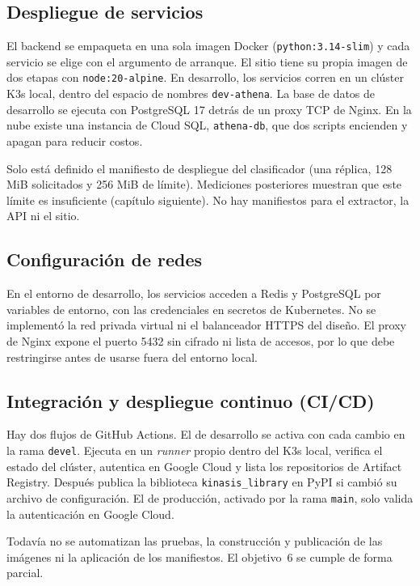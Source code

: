\subsection{Despliegue de servicios}
El backend se empaqueta en una sola imagen Docker (\texttt{python:3.14-slim}) y cada servicio se elige con el argumento de arranque. El sitio tiene su propia imagen de dos etapas con \texttt{node:20-alpine}. En desarrollo, los servicios corren en un clúster K3s local, dentro del espacio de nombres \texttt{dev-athena}. La base de datos de desarrollo se ejecuta con PostgreSQL 17 detrás de un proxy TCP de Nginx. En la nube existe una instancia de Cloud SQL, \texttt{athena-db}, que dos scripts encienden y apagan para reducir costos.

Solo está definido el manifiesto de despliegue del clasificador (una réplica, 128 MiB solicitados y 256 MiB de límite). Mediciones posteriores muestran que este límite es insuficiente (capítulo siguiente). No hay manifiestos para el extractor, la API ni el sitio.

\subsection{Configuración de redes}
En el entorno de desarrollo, los servicios acceden a Redis y PostgreSQL por variables de entorno, con las credenciales en secretos de Kubernetes. No se implementó la red privada virtual ni el balanceador HTTPS del diseño. El proxy de Nginx expone el puerto 5432 sin cifrado ni lista de accesos, por lo que debe restringirse antes de usarse fuera del entorno local.

\subsection{Integración y despliegue continuo (CI/CD)}
Hay dos flujos de GitHub Actions. El de desarrollo se activa con cada cambio en la rama \texttt{devel}. Ejecuta en un \textit{runner} propio dentro del K3s local, verifica el estado del clúster, autentica en Google Cloud y lista los repositorios de Artifact Registry. Después publica la biblioteca \texttt{kinasis\_library} en PyPI si cambió su archivo de configuración. El de producción, activado por la rama \texttt{main}, solo valida la autenticación en Google Cloud.

Todavía no se automatizan las pruebas, la construcción y publicación de las imágenes ni la aplicación de los manifiestos. El objetivo~6 se cumple de forma parcial.

